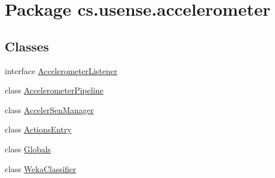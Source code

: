 \hypertarget{namespacecs_1_1usense_1_1accelerometer}{}\section{Package cs.\+usense.\+accelerometer}
\label{namespacecs_1_1usense_1_1accelerometer}
\subsection*{Classes}
\begin{DoxyCompactItemize}
\item 
interface \hyperlink{interfacecs_1_1usense_1_1accelerometer_1_1_accelerometer_listener}{Accelerometer\+Listener}
\item 
class \hyperlink{classcs_1_1usense_1_1accelerometer_1_1_accelerometer_pipeline}{Accelerometer\+Pipeline}
\item 
class \hyperlink{classcs_1_1usense_1_1accelerometer_1_1_acceler_sen_manager}{Acceler\+Sen\+Manager}
\item 
class \hyperlink{classcs_1_1usense_1_1accelerometer_1_1_actions_entry}{Actions\+Entry}
\item 
class \hyperlink{classcs_1_1usense_1_1accelerometer_1_1_globals}{Globals}
\item 
class \hyperlink{classcs_1_1usense_1_1accelerometer_1_1_weka_classifier}{Weka\+Classifier}
\end{DoxyCompactItemize}


